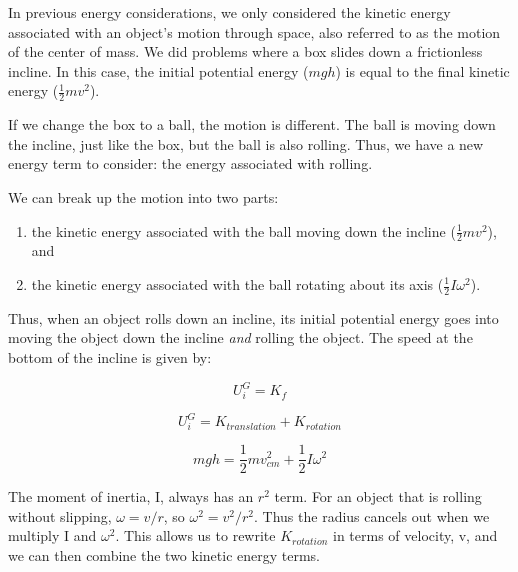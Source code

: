 In previous energy considerations, we only considered the kinetic 
energy associated with an object's motion through space, also referred to as
the motion of the center of mass.  We did problems where
a box slides down a frictionless incline.  In this case, the initial 
potential energy ($m g h$) is equal to the final kinetic energy ($\frac{1}{2} m v^2$).

If we change the box to a ball, the motion is different.  The ball is moving
down the incline, just like the box, but the ball is also rolling.  Thus,
 we have a new energy term to consider: the energy associated with rolling.  

We can break up the motion into two parts:  
\begin{enumerate}
\item the kinetic energy associated
with the ball moving down the incline ($\frac{1}{2} m v^2$), and 
\item the kinetic
energy associated with the ball rotating about its axis ($\frac{1}{2} I \omega^2$).  
\end{enumerate}
Thus, when an object rolls down an incline, its initial potential energy goes
into moving the object down the incline {\em and} rolling the object.  The
speed at the bottom of the incline is given by:

$$U^G_i = K_f  $$

$$U^G_i = K_{translation} + K_{rotation} $$

$$m g h = \frac{1}{2} m v_{cm}^2 + \frac{1}{2} I \omega^2 $$


The moment of inertia, I, always has an $r^2$ term. For an object that is rolling without slipping, $\omega = v/r$, so $\omega^2 = v^2/r^2$.  Thus the radius cancels out when we multiply I and $\omega^2$.  
This allows us to rewrite $K_{rotation}$ in terms of velocity, v, and we
can then combine the two kinetic energy terms.

